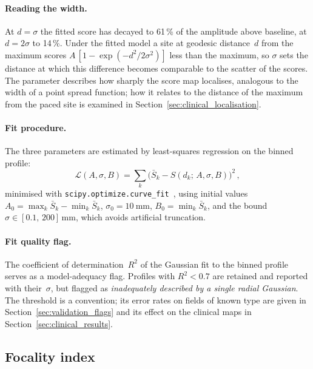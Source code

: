\documentclass[a4paper,fleqn]{cas-dc}
\begin{document}
\paragraph{Reading the width.}
At $d = \sigma$ the fitted score has decayed to 61\,\% of the amplitude
above baseline, at $d = 2\sigma$ to 14\,\%.  Under the fitted model a
site at geodesic distance~$d$ from the maximum scores
$A\,[1 - \exp(-d^2/2\sigma^2)]$ less than the maximum, so $\sigma$ sets
the distance at which this difference becomes comparable to the scatter
of the scores.  The parameter
describes how sharply the score map localises, analogous to the width of
a point spread function; how it relates to the distance of the maximum
from the paced site is examined in Section~\ref{sec:clinical_localisation}.

\paragraph{Fit procedure.}
The three parameters are estimated by least-squares regression on the
binned profile:
\begin{equation}
  \mathcal{L}(A, \sigma, B) =
    \sum_{k}\bigl(\bar{S}_k - S(d_k;\,A,\sigma,B)\bigr)^2\,,
  \label{eq:cost}
\end{equation}
minimised with \texttt{scipy.optimize.curve\_fit}~\citep{virtanen2020},
using initial values $A_0 = \max_k \bar{S}_k - \min_k \bar{S}_k$,
$\sigma_0 = \SI{10}{\milli\metre}$, $B_0 = \min_k \bar{S}_k$, and the bound
$\sigma \in [0.1,\,200]\,\si{\milli\metre}$, which avoids artificial
truncation.

\paragraph{Fit quality flag.}
The coefficient of determination~$R^2$ of the Gaussian fit to the binned
profile serves as a model-adequacy flag.  Profiles with $R^2 < 0.7$ are
retained and reported with their~$\sigma$, but flagged as
\emph{inadequately described by a single radial Gaussian}.  The
threshold is a convention; its error rates on fields of known type are
given in Section~\ref{sec:validation_flags} and its effect on the
clinical maps in Section~\ref{sec:clinical_results}.


\subsection{Focality index}\label{sec:focality}
\end{document}
